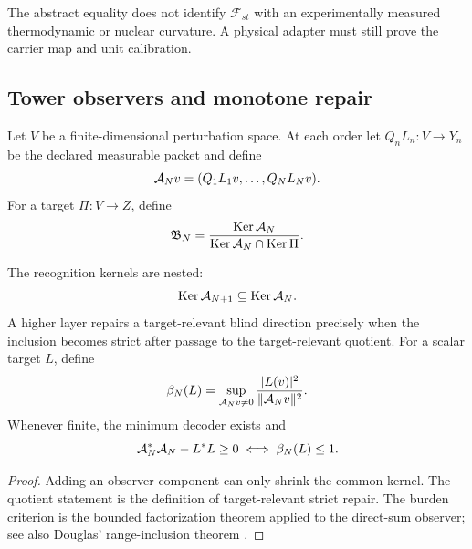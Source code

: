 The abstract equality does not identify $\mathcal F_{st}$ with an experimentally measured thermodynamic or nuclear curvature. A physical adapter must still prove the carrier map and unit calibration.

\subsection{Tower observers and monotone repair}

Let $V$ be a finite-dimensional perturbation space. At each order let $Q_nL_n:V\to Y_n$ be the declared measurable packet and define
\[
 \mathcal A_Nv=(Q_1L_1v,\ldots,Q_NL_Nv).
\]
For a target $\Pi:V\to Z$, define
\[
 \mathfrak B_N=\frac{\operatorname{Ker}\mathcal A_N}{\operatorname{Ker}\mathcal A_N\cap\operatorname{Ker}\Pi}.
\]

\begin{theorem}\label{thm:t42monotone}
The recognition kernels are nested:
\[
 \operatorname{Ker}\mathcal A_{N+1}\subseteq\operatorname{Ker}\mathcal A_N.
\]
A higher layer repairs a target-relevant blind direction precisely when the inclusion becomes strict after passage to the target-relevant quotient. For a scalar target $L$, define
\[
 \beta_N(L)=\sup_{\mathcal A_Nv\ne0}
 \frac{|L(v)|^2}{\|\mathcal A_Nv\|^2}.
\]
Whenever finite, the minimum decoder exists and
\[
 \mathcal A_N^*\mathcal A_N-L^*L\ge0
 \iff \beta_N(L)\le1.
\]
\end{theorem}

\begin{proof}
Adding an observer component can only shrink the common kernel. The quotient statement is the definition of target-relevant strict repair. The burden criterion is the bounded factorization theorem applied to the direct-sum observer; see also Douglas' range-inclusion theorem \cite{douglas1966}.
\end{proof}
